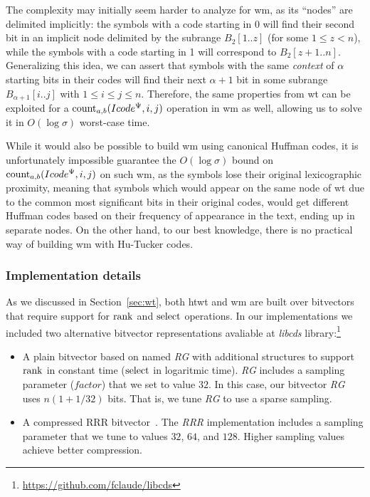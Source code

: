 	The complexity may initially seem harder to analyze for \gls{wm}, as its ``nodes'' are delimited implicitly: the symbols with a code starting in 0 will find their second bit in an implicit node delimited by the subrange $B_2[1..z]$ (for some $1 \leq z < n$), while the symbols with a code starting in 1 will correspond to $B_2[z+1..n]$. Generalizing this idea, we can assert that symbols with the same \textit{context} of $\alpha$ starting bits in their codes will find their next $\alpha+1$ bit in some subrange $B_{\alpha+1}[i..j]$ with $1 \leq i \leq j \leq n$. Therefore, the same properties from \gls{wt} can be exploited for a $\operatorname{count}_{a,b}(Icode^{\Psi},i,j)$ operation in \gls{wm} as well, allowing us to solve it in $O(\log\sigma)$ worst-case time.

	While it would also be possible to build \gls{wm} using canonical Huffman codes, it is unfortunately impossible guarantee the $O(\log\sigma)$ bound on $\operatorname{count}_{a,b}(Icode^{\Psi},i,j)$ on such \gls{wm}, as the symbols lose their original lexicographic proximity, meaning that symbols which would appear on the same node of \gls{wt} due to the common most significant bits in their original codes, would get different Huffman codes based on their frequency of appearance in the text, ending up in separate nodes. On the other hand, to our best knowledge, there is no practical way of building \gls{wm} with Hu-Tucker codes.

	\subsubsection{Implementation details} 
	\label{sec:ctr:str:time:imp}
	As we discussed in Section~\ref{sec:wt}, both \gls{htwt} and \gls{wm} are built over bitvectors that require support for $\operatorname{rank}$ and $\operatorname{select}$ operations. In our implementations we included two alternative bitvector representations avaliable
	at {\em libcds} library:{\footnote{\url{https://github.com/fclaude/libcds}}}
	
	\begin{itemize}
		\item A plain bitvector based on \cite{Mun96} named {\em RG} with 
		additional structures to support $\operatorname{rank}$ in constant time ($\operatorname{select}$ in logaritmic time).
		{\em RG} includes a sampling parameter ($factor$) that we set to value $32$. In this case,
		our  bitvector {\em RG} uses $n (1+1/32)$ bits. That is, we tune {\em RG} to use a sparse sampling. 
			
		\item A compressed RRR bitvector~\cite{Raman:2002:SID:545381.545411}. The {\em RRR} implementation includes
		a sampling parameter that we tune to values $32$, $64$, and $128$. Higher sampling values achieve better compression.
	\end{itemize}


